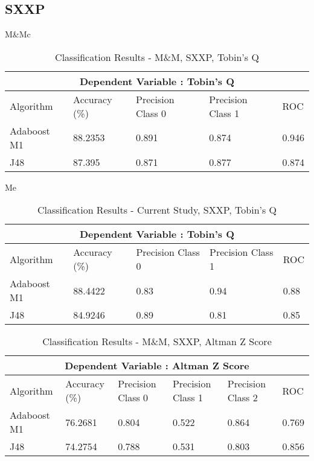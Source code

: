 \subsection{SXXP}
{M\&M}c\begin{table}[h!]
\centering
\begin{tabular}{ |p{2.5cm}||p{2.5cm}|p{2.5cm}|p{2.5cm}|p{1.5cm}|  }
 \hline
 \multicolumn{5}{|c|}{Dependent Variable : Tobin's Q} \\
 \hline
 Algorithm & Accuracy (\%) & Precision Class 0 & Precision Class 1 & ROC \\
 \hline
 Adaboost M1  &  88.2353     & 0.891 &  0.874 & 0.946  \\
 J48  & 87.395  & 0.871 &  0.877 & 0.874  \\
 \hline
\end{tabular}
\caption{Classification Results  - M\&M, SXXP, Tobin's Q}
\end{table}

{Me}
\begin{table}[h!]
\centering
\begin{tabular}{ |p{2.5cm}||p{2.5cm}|p{2.5cm}|p{2.5cm}|p{1.5cm}|  }
 \hline
 \multicolumn{5}{|c|}{Dependent Variable : Tobin's Q} \\
 \hline
 Algorithm & Accuracy (\%) & Precision Class 0 & Precision Class 1 & ROC \\
 \hline
 Adaboost M1  &  88.4422     & 0.83 &  0.94 & 0.88  \\
 J48  & 84.9246  & 0.89 &  0.81 & 0.85  \\
 \hline
\end{tabular}
\caption{Classification Results  - Current Study, SXXP, Tobin's Q}
\end{table}
\clearpage


\begin{table}[h!]
\centering
\begin{tabular}{ |p{2.5cm}||p{2.5cm}|p{2.5cm}|p{2.5cm}|p{2.5cm}|p{1.5cm}|  }
 \hline
 \multicolumn{6}{|c|}{Dependent Variable : Altman Z Score} \\
 \hline
 Algorithm & Accuracy (\%) & Precision Class 0 & Precision Class 1 & Precision Class 2 & ROC \\
 \hline
 Adaboost M1  &  76.2681     & 0.804 &  0.522 & 0.864 & 0.769  \\
 J48  & 74.2754  & 0.788 &  0.531 & 0.803 & 0.856  \\
 \hline
\end{tabular}
\caption{Classification Results  - M\&M, SXXP, Altman Z Score}
\end{table}


